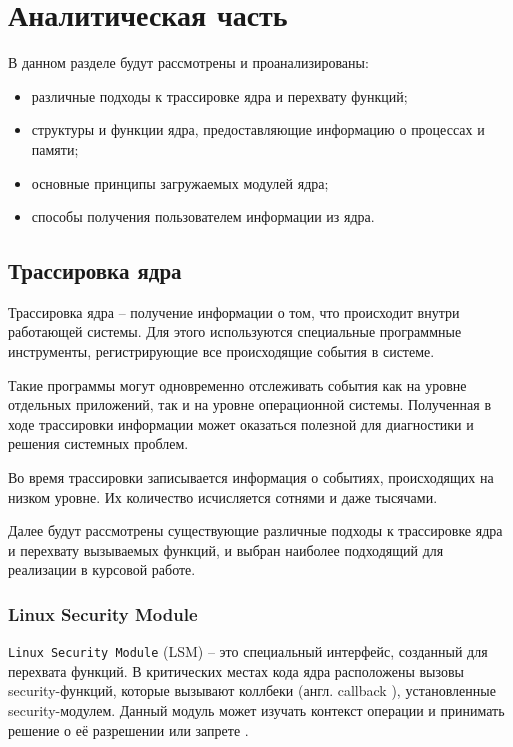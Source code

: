 \chapter{Аналитическая часть}

В данном разделе будут рассмотрены и проанализированы:

\begin{itemize}
	\item различные подходы к трассировке ядра  и перехвату функций;
	\item структуры и функции ядра, предоставляющие информацию о процессах и памяти;
	\item основные принципы загружаемых модулей ядра;
	\item способы получения пользователем информации из ядра.
\end{itemize}

\section{Трассировка ядра}

Трассировка ядра -- получение информации о том, что происходит внутри работающей системы. Для этого используются специальные программные инструменты, регистрирующие все происходящие события в системе.

Такие программы могут одновременно отслеживать события как на уровне отдельных приложений, так и на уровне операционной системы. Полученная в ходе трассировки информации может оказаться полезной для диагностики и решения системных проблем.

Во время трассировки записывается информация о событиях, происходящих на низком уровне. Их количество исчисляется сотнями и даже тысячами. 

Далее будут рассмотрены существующие различные подходы к трассировке ядра и перехвату вызываемых функций, и выбран наиболее подходящий для реализации в курсовой работе.

\subsection{Linux Security Module}

\texttt{Linux Security Module} (LSM) \cite{linux-security-api} -- это специальный интерфейс, созданный для перехвата функций. В критических местах кода ядра расположены вызовы security-функций, которые вызывают коллбеки (англ. callback \cite{callback}), установленные security-модулем. Данный модуль может изучать контекст операции и принимать решение о её разрешении или запрете \cite{linux-security-api}.


